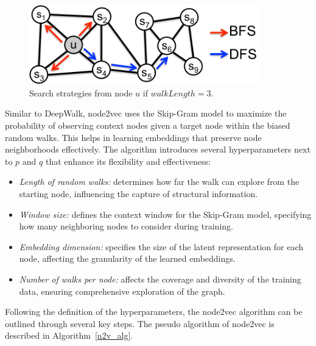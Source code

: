\begin{figure}[ht!]
	\centering
        \vspace{0.5cm}
	\includegraphics[width=0.90\textwidth]{figures/bfsdfs}
        \vspace{0.25cm}
	\caption{Search strategies from node $u$ if $walkLength=3$.}
	\label{strategies}
        \vspace{0.5cm}
\end{figure}

Similar to DeepWalk, node2vec uses the Skip-Gram model to maximize the probability of observing context nodes given a target node within the biased random walks. This helps in learning embeddings that preserve node neighborhoods effectively. The algorithm introduces several hyperparameters next to $p$ and $q$ that enhance its flexibility and effectiveness: 

\begin{itemize}
    \item \emph{Length of random walks:} determines how far the walk can explore from the starting node, influencing the capture of structural information.
    \item \emph{Window size:} defines the context window for the Skip-Gram model, specifying how many neighboring nodes to consider during training.
    \item \emph{Embedding dimension:} specifies the size of the latent representation for each node, affecting the granularity of the learned embeddings.
    \item \emph{Number of walks per node:} affects the coverage and diversity of the training data, ensuring comprehensive exploration of the graph.
\end{itemize}

Following the definition of the hyperparameters, the node2vec algorithm can be outlined through several key steps. The pseudo algorithm of node2vec is described in Algorithm~\ref{n2v_alg}.

